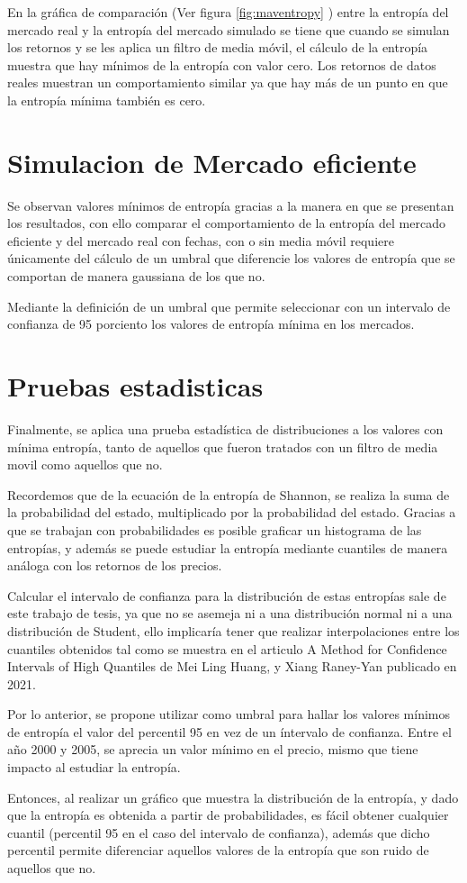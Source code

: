 En la gráfica de comparación (Ver figura \ref{fig:maventropy} ) entre la entropía del mercado real y la entropía del mercado simulado se tiene que cuando se simulan los retornos y se les aplica un filtro de media móvil, el cálculo de la entropía muestra que hay mínimos de la entropía con valor cero. Los retornos de datos reales muestran un comportamiento similar ya que hay más de un punto en que la entropía mínima también es cero.

\section{Simulacion de Mercado eficiente}
Se observan valores mínimos de entropía gracias a la manera en que se presentan los resultados, 
con ello comparar el comportamiento de la entropía del mercado eficiente y del mercado real con fechas, 
con o sin media móvil requiere únicamente del cálculo de un umbral que diferencie los valores de entropía que se comportan de manera gaussiana  de los que no.

Mediante la definición de un umbral que permite seleccionar con un intervalo de confianza de 95 porciento los valores de entropía mínima en los mercados. 


\section{Pruebas estadisticas}

Finalmente, se aplica una prueba estadística de distribuciones a los valores con mínima entropía, tanto de aquellos que fueron tratados con un filtro de media movil como aquellos que no. 

Recordemos que de la ecuación de la entropía de Shannon, se realiza la suma de la probabilidad del estado, multiplicado por la probabilidad del estado. Gracias a que se trabajan con probabilidades es posible graficar un histograma de las entropías, y además se puede estudiar la entropía mediante cuantiles de manera análoga con los retornos de los precios.

Calcular el intervalo de confianza para la distribución de estas entropías sale de este trabajo de tesis, ya que no se asemeja ni a una distribución normal ni a una distribución de Student, ello implicaría tener que realizar interpolaciones entre los cuantiles obtenidos tal como se muestra en el articulo A Method for Confidence Intervals of High Quantiles de Mei Ling Huang, y Xiang Raney-Yan publicado en 2021. 

Por lo anterior, se propone utilizar como umbral para hallar los valores mínimos de entropía el valor del percentil 95 en vez de un íntervalo de confianza. Entre el año 2000 y 2005, se aprecia un valor mínimo en el precio, mismo que tiene impacto al estudiar la entropía.


Entonces, al realizar un gráfico que muestra la distribución de la entropía, y dado que la entropía es obtenida a partir de probabilidades, es fácil obtener cualquier cuantil (percentil 95 en el caso del intervalo de confianza), además que dicho percentil permite diferenciar aquellos valores de la entropía que son ruido de aquellos que no. 

